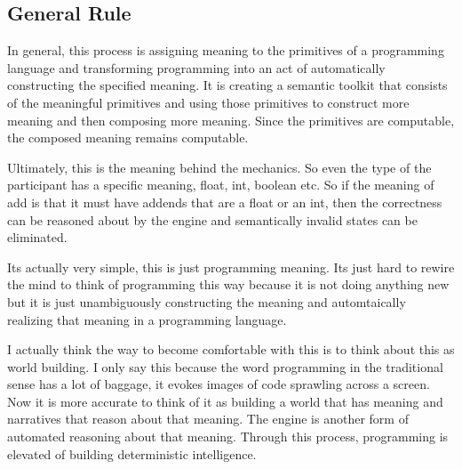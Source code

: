 \subsection{General Rule}

In general, this process is assigning meaning to the primitives of a programming language and transforming programming into an act of automatically constructing the specified meaning. It is creating a semantic toolkit that consists of the meaningful primitives and using those primitives to construct more meaning and then composing more meaning. Since the primitives are computable, the composed meaning remains computable. 

Ultimately, this is the meaning behind the mechanics. So even the type of the participant has a specific meaning, float, int, boolean etc. So if the meaning of add is that it must have addends that are a float or an int, then the correctness can be reasoned about by the engine and semantically invalid states can be eliminated.

Its actually very simple, this is just programming meaning. Its just hard to rewire the mind to think of programming this way because it is not doing anything new but it is just unambiguously constructing the meaning and automtaically realizing that meaning in a programming language.

I actually think the way to become comfortable with this is to think about this as world building. I only say this because the word programming in the traditional sense has a lot of baggage, it evokes images of code sprawling across a screen. Now it is more accurate to think of it as building a world that has meaning and narratives that reason about that meaning. The engine is another form of automated reasoning about that meaning. Through this process, programming is elevated of building deterministic intelligence.